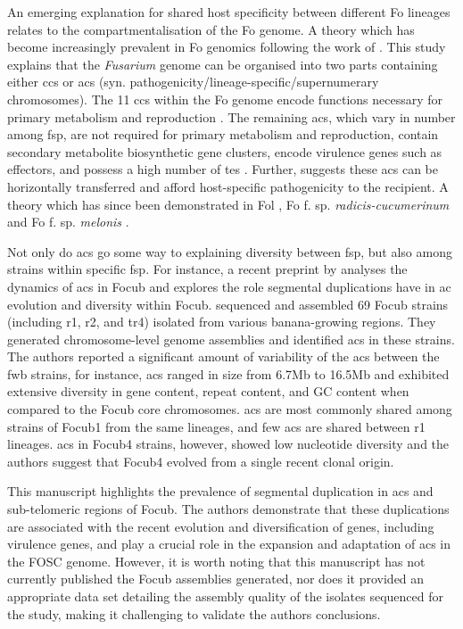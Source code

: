 An emerging explanation for shared host specificity between different \ac{Fo} lineages relates to the compartmentalisation of the \acl{Fo} genome. A theory which has become increasingly prevalent in \ac{Fo} genomics following the work of \textcite{Ma2010}. This study explains that the \textit{Fusarium} genome can be organised into two parts containing either \acp{cc} or \acp{ac} (syn. pathogenicity/lineage-specific/supernumerary chromosomes). The 11 \acp{cc} within the \ac{Fo} genome encode functions necessary for primary metabolism and reproduction \parencite{Dam2017}. The remaining \acp{ac}, which vary in number among \ac{fsp}, are not required for primary metabolism and reproduction, contain secondary metabolite biosynthetic gene clusters, encode virulence genes such as effectors, and possess a high number of \acp{te} \parencite{Ma2010, Schmidt2013, Witte2021}. Further, \textcite{Ma2010} suggests these \acp{ac} can be horizontally transferred and afford host-specific pathogenicity to the recipient. A theory which has since been demonstrated in \ac{Fol} \parencite{Vlaardingerbroek2016, Li2020}, \ac{Fo} f. sp. \textit{radicis-cucumerinum} \parencite{Dam2017} and \ac{Fo} f. sp.  \textit{melonis} \parencite{Li2020}. 
 
Not only do \acp{ac} go some way to explaining diversity between \ac{fsp}, but also among strains within specific \ac{fsp}. For instance, a recent preprint by \textcite{Westerhoven2023} analyses the dynamics of \acp{ac} in \ac{Focub} and explores the role segmental duplications have in \ac{ac} evolution and diversity within \ac{Focub}. \textcite{Westerhoven2023} sequenced and assembled 69 \ac{Focub} strains (including \ac{r1}, \ac{r2}, and \ac{tr4})  isolated from various banana-growing regions. They generated chromosome-level genome assemblies and identified \acp{ac} in these strains.  The authors reported a significant amount of variability of the \acp{ac} between the \ac{fwb} strains, for instance, \acp{ac} ranged in size from 6.7Mb to 16.5Mb and exhibited extensive diversity in gene content, repeat content, and GC content when compared to the \ac{Focub} core chromosomes. \Acp{ac} are most commonly shared among strains of \ac{Focub1} from the same lineages, and few \acp{ac} are shared between \ac{r1} lineages. \Acp{ac} in \ac{Focub4} strains, however, showed low nucleotide diversity and the authors suggest that \ac{Focub4} evolved from a single recent clonal origin. 

This manuscript highlights the prevalence of segmental duplication in \acp{ac} and sub-telomeric regions of \ac{Focub}. The authors demonstrate that these duplications are associated with the recent evolution and diversification of genes, including virulence genes, and play a crucial role in the expansion and adaptation of \acp{ac} in the \ac{FOSC} genome. However, it is worth noting that this manuscript has not currently published the \ac{Focub} assemblies generated, nor does it provided an appropriate data set detailing the assembly quality of the isolates sequenced for the study, making it challenging to validate the authors conclusions. 

